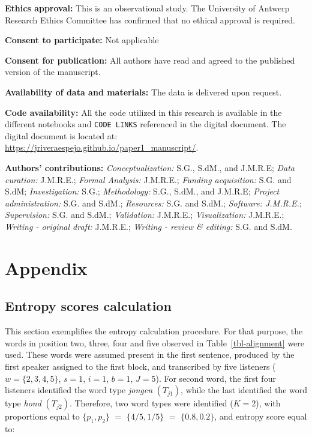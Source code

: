 \documentclass[
sn-apacite
]{sn-jnl}
\begin{document}
\textbf{Ethics approval:} This is an observational study. The University
of Antwerp Research Ethics Committee has confirmed that no ethical
approval is required.

\textbf{Consent to participate:} Not applicable

\textbf{Consent for publication:} All authors have read and agreed to
the published version of the manuscript.

\textbf{Availability of data and materials:} {The data is delivered upon
request.}

\textbf{Code availability:} {All the code utilized in this research is
available in the different notebooks and \texttt{CODE\ LINKS} referenced
in the digital document. The digital document is located at:}
\url{https://jriveraespejo.github.io/paper1_manuscript/}.

\textbf{Authors' contributions:} \emph{Conceptualization:} S.G., S.dM.,
and J.M.R.E; \emph{Data curation:} J.M.R.E.; \emph{Formal Analysis:}
J.M.R.E.; \emph{Funding acquisition:} S.G. and S.dM;
\emph{Investigation:} S.G.; \emph{Methodology:} S.G., S.dM., and
J.M.R.E; \emph{Project administration:} S.G. and S.dM.;
\emph{Resources:} S.G. and S.dM.; \emph{Software: J.M.R.E.};
\emph{Supervision:} S.G. and S.dM.; \emph{Validation:} J.M.R.E.;
\emph{Visualization:} J.M.R.E.; \emph{Writing - original draft:}
J.M.R.E.; \emph{Writing - review \& editing:} S.G. and S.dM.

\newpage{}

\section{Appendix}\label{sec-appendix}

\subsection{Entropy scores calculation}\label{sec-appA}

This section exemplifies the entropy calculation procedure. {For that
purpose, the words in position two, three, four and five observed in
Table~\ref{tbl-alignment} were used. These words were assumed present in
the first sentence, produced by the first speaker assigned to the first
block, and transcribed by five listeners (\(w=\{2,3,4,5\}\), \(s=1\),
\(i=1\), \(b=1\), \(J=5\)). For second word,} the first four listeners
identified the word type \emph{jongen} \((T_{j1})\), while the last
identified the word type \emph{hond} \((T_{j2})\). Therefore, two word
types were identified (\(K=2\)), with proportions equal to
\(\{ p_{1}, p_{2} \}\) \(=\) \(\{ 4/5, 1/5 \}\) \(=\)
\(\{ 0.8, 0.2 \}\), and entropy score equal to:
\end{document}
